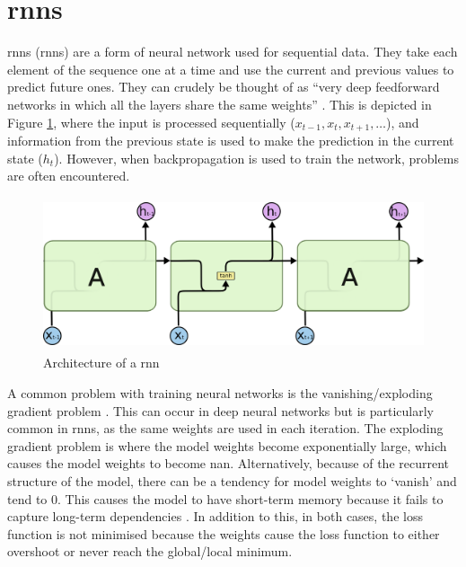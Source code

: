\section{\acrlong{rnn}s}\label{sec:background_rnns}
\acrlong{rnn}s (\acrshort{rnn}s) are a form of neural network used for sequential data. They take each element of the sequence one at a time and use the current and previous values to predict future ones. They can crudely be thought of as ``very deep feedforward networks in which all the layers share the same weights'' \citep{Yann}. This is depicted in Figure \ref{fig:rnn_architecture}, where the input is processed sequentially ($x_{t-1}, x_{t}, x_{t+1},\ldots$), and information from the previous state is used to make the prediction in the current state ($h_{t}$). However, when backpropagation is used to train the network, problems are often encountered.

\begin{figure}[h]
    \centering
    \includegraphics[height=4.5cm,trim={0 0 0cm 0cm},clip]{paper/images/rnn.png}
    \caption{Architecture of a \acrlong{rnn} \citep{olah2015understanding}}
    \label{fig:rnn_architecture}
\end{figure}

A common problem with training neural networks is the vanishing/exploding gradient problem \citep{hochreiter1997long}. This can occur in deep neural networks but is particularly common in \acrshort{rnn}s, as the same weights are used in each iteration. The exploding gradient problem is where the model weights become exponentially large, which causes the model weights to become \acrshort{nan}. Alternatively, because of the recurrent structure of the model, there can be a tendency for model weights to `vanish' and tend to 0. This causes the model to have short-term memory because it fails to capture long-term dependencies \citep{chung2014empirical}. In addition to this, in both cases, the loss function is not minimised because the weights cause the loss function to either overshoot or never reach the global/local minimum.

